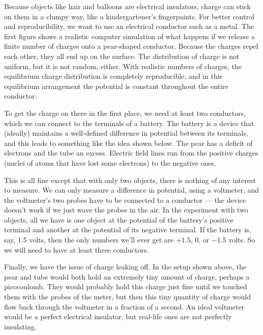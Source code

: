 Because objects like hair and balloons are electrical insulators,
charge can stick on them in a clumpy way, like a kindergartener's
fingerpaints. For better control and reproducibility, we want to use
an electrical conductor such as a metal. The first figure shows a realistic
computer simulation of what happens if we release a finite number of
charges onto a pear-shaped conductor. Because the charges  repel each
other, they all end up on the surface. The distribution of charge is
not uniform, but it is not random, either. With realistic numbers of
charges, the equilibrium charge distribution is completely reproducible,
and in this equilibrium arrangement the potential is constant throughout
the entire conductor.


To get the charge on there in the first place, we need at least two
conductors, which we can connect to the terminals of a battery.
The battery is a device that (ideally) maintains a well-defined
difference in potential between its terminals, and this leads to
something like the idea shown below. The pear has a deficit of
electrons and the tube an excess. Electric field lines run from
the positive charges (nuclei of atoms that have lost some electrons)
to the negative ones.


This is all fine except that with only two objects, there is nothing
of any interest to measure. We can only measure a difference in potential,
using a voltmeter, and the voltmeter's two probes have to be connected
to a conductor --- the device doesn't work if we just wave the probes
in the air. In the experiment with two objects,
all we have is one object at the potential of
the battery's positive terminal and another at the potential of its
negative terminal. If the battery is, say, 1.5 volts, then the only
numbers we'll ever get are $+1.5$, 0, or $-1.5$ volts. So we will
need to have at least three conductors.

Finally, we have the issue of charge leaking off. In the setup shown
above, the pear and tube would both hold an extremely tiny amount of
charge, perhaps a picocoulomb. They would probably hold this charge just fine until
we touched them with the probes of the meter, but then this tiny quantity of charge would
flow back through the voltmeter in a fraction of a second. An ideal
voltmeter would be a perfect electrical insulator, but real-life ones
are not perfectly insulating.

